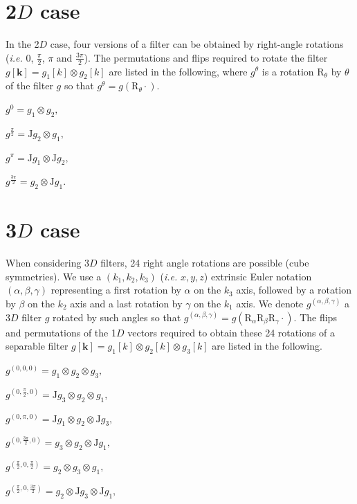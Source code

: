 \documentclass[fleqn,a4paper,oneside,openany]{book}
\begin{document}
\section{2$D$ case}
In the 2$D$ case, four versions of a filter can be obtained by right-angle rotations (\textit{i.e.} $0$, $\frac{\pi}{2}$, $\pi$ and $\frac{3\pi}{2}$). The permutations and flips required to rotate the filter $g[\boldsymbol{k}]= g_{1}[k]\otimes g_{2}[k]$ are listed in the following, where $g^{\theta}$ is a rotation $\mathrm{R}_{\theta}$ by $\theta$  of the filter $g$ so that $g^{\theta}=g(\mathrm{R}_{\theta}\cdot)$.

$g^0= g_{1}\otimes g_{2},$

$g^{\frac{\pi}{2}}= \mathrm{J} g_{2}\otimes g_{1},$

$g^{\pi}= \mathrm{J} g_{1}\otimes \mathrm{J} g_{2},$

$g^{\frac{3\pi}{2}}= g_{2}\otimes \mathrm{J} g_{1}.$


\section{3$D$ case}
When considering 3$D$ filters, 24 right angle rotations are possible (cube symmetries). 
We use a $(k_1,k_2,k_3)$ (\textit{i.e.} $x,y,z$) extrinsic Euler notation $(\alpha,\beta,\gamma)$ representing a first rotation by $\alpha$ on the $k_3$ axis, followed by a rotation by $\beta$ on the $k_2$ axis and a last rotation by $\gamma$ on the $k_1$ axis.
We denote $g^{(\alpha,\beta,\gamma)}$ a 3$D$ filter $g$ rotated by such angles so that $g^{(\alpha,\beta,\gamma)} = g(\mathrm{R}_{\alpha}\mathrm{R}_{\beta}\mathrm{R}_{\gamma}\cdot)$.
The flips and permutations of the 1$D$ vectors required to obtain these 24 rotations of a separable filter $g[\boldsymbol{k}]= g_{1}[k]\otimes g_{2}[k]\otimes g_{3}[k]$ are listed in the following.

$g^{(0,0,0)}= g_{1}\otimes g_{2}\otimes g_{3},$

$g^{(0,\frac{\pi}{2},0)}= \mathrm{J}g_{3}\otimes g_{2}\otimes g_{1},$

$g^{(0,\pi,0)}= \mathrm{J}g_{1}\otimes g_{2}\otimes \mathrm{J}g_{3},$

$g^{(0,\frac{3\pi}{2},0)}= g_{3}\otimes g_{2}\otimes \mathrm{J}g_{1},$

$g^{(\frac{\pi}{2},0,\frac{\pi}{2})}= g_{2}\otimes g_{3}\otimes g_{1},$

$g^{(\frac{\pi}{2},0,\frac{3\pi}{2})}= g_{2}\otimes \mathrm{J}g_{3}\otimes \mathrm{J}g_{1},$
\end{document}
